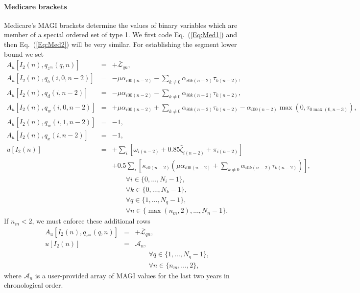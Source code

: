 \documentclass{report}[fleqn,11pt]
\begin{document}
\paragraph*{Medicare brackets}
Medicare's MAGI brackets determine the values of binary variables which are
member of a special ordered set of type 1.
We first code Eq.~(\ref{Eq:Med1}) and then Eq.~(\ref{Eq:Med2}) will be very similar.
For establishing the segment lower bound we set
\begin{eqnarray}
	A_u[I_2(n), q_{z^m}(q, n)] &=& +\bar{\mathcal{L}}_{qn}, \nonumber \\
	A_u[I_2(n), q_{b}(i, 0, n-2)] &=&
	    - \mu \alpha_{i00(n-2)}
	    - \sum_{k\neq 0} \alpha_{i0k(n-2)}\tau_{k(n-2)},
	    \nonumber \\
	A_u[I_2(n), q_{d}(i, n-2)] &=&
	    - \mu \alpha_{i00(n-2)}
	    - \sum_{k\neq 0} \alpha_{i0k(n-2)}\tau_{k(n-2)},
	    \nonumber \\
	A_u[I_2(n), q_{w}(i, 0, n-2)] &=&
		+ \mu \alpha_{i00(n-2)}
		+ \sum_{k\neq 0} \alpha_{i0k(n-2)}\tau_{k(n-2)}
	 	-\alpha_{i00(n-2)}\max(0, \tau_{0\max(0, n-3)}), \nonumber \\
	A_u[I_2(n), q_{w}(i, 1, n-2)] &=& -1, \nonumber \\
	A_u[I_2(n), q_{x}(i, n-2)] &=& -1, \nonumber \\
	u[I_2(n)] &=& +\sum_i \left[\omega_{i(n-2)} + 0.85\bar{\zeta}_{i(n-2)} + \pi_{i(n-2)} \right]\nonumber \\
	&& + 0.5 \sum_i \left[\kappa_{i0(n-2)}  \left(
	  \mu\alpha_{i00(n-2)} + \sum_{k\neq 0} \alpha_{i0k(n-2)}\tau_{k(n-2)}
	  \right)\right],\nonumber\\
	&&\qquad\forall i \in \{0,\ldots, N_i - 1\}, \nonumber\\
	&&\qquad\forall k \in \{0,\ldots, N_k - 1\}, \nonumber\\
	&&\qquad\forall q \in \{1,\ldots, N_q - 1\}, \nonumber\\
	&&\qquad\forall n \in \{\max(n_m, 2),\ldots, N_n - 1\}.
\end{eqnarray}
If $n_m < 2$, we must enforce these additional rows
\begin{eqnarray}
	A_u[I_2(n), q_{z^m}(q, n)] &=& +\bar{\mathcal{L}}_{qn}, \nonumber \\
	u[I_2(n)] &=& \mathcal{A}_{n}, \nonumber \\
	&&\qquad\forall q \in \{1,\ldots, N_q - 1\}, \nonumber\\
	&&\qquad\forall n \in \{n_m,\ldots, 2\},
\end{eqnarray}
where $\mathcal{A}_n$ is a user-provided array of MAGI values for the last two years in chronological order.
\end{document}
